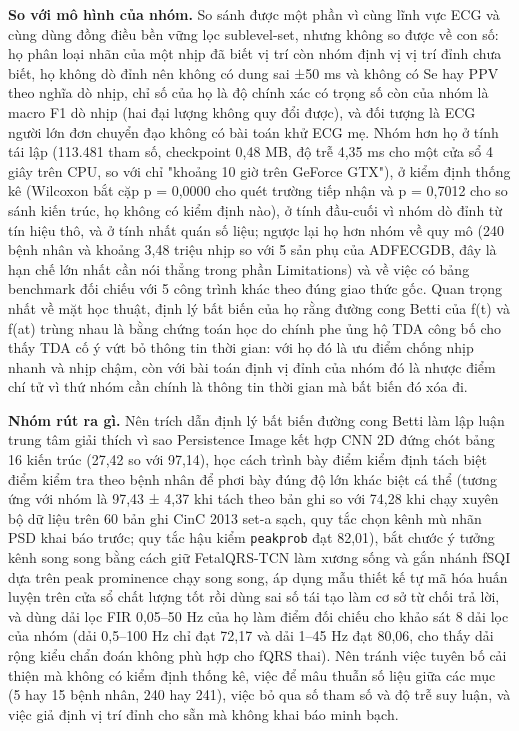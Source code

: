 \documentclass[12pt,a4paper]{article}
\begin{document}
\noindent \textbf{\color{tdtblue}So với mô hình của nhóm.} So sánh được một phần vì cùng lĩnh vực ECG và cùng dùng đồng điều bền vững lọc sublevel-set, nhưng không so được về con số: họ phân loại nhãn của một nhịp đã biết vị trí còn nhóm định vị vị trí đỉnh chưa biết, họ không dò đỉnh nên không có dung sai ±50 ms và không có Se hay PPV theo nghĩa dò nhịp, chỉ số của họ là độ chính xác có trọng số còn của nhóm là macro F1 dò nhịp (hai đại lượng không quy đổi được), và đối tượng là ECG người lớn đơn chuyển đạo không có bài toán khử ECG mẹ. Nhóm hơn họ ở tính tái lập (113.481 tham số, checkpoint 0,48 MB, độ trễ 4,35 ms cho một cửa sổ 4 giây trên CPU, so với chỉ "khoảng 10 giờ trên GeForce GTX"), ở kiểm định thống kê (Wilcoxon bắt cặp p = 0,0000 cho quét trường tiếp nhận và p = 0,7012 cho so sánh kiến trúc, họ không có kiểm định nào), ở tính đầu-cuối vì nhóm dò đỉnh từ tín hiệu thô, và ở tính nhất quán số liệu; ngược lại họ hơn nhóm về quy mô (240 bệnh nhân và khoảng 3,48 triệu nhịp so với 5 sản phụ của ADFECGDB, đây là hạn chế lớn nhất cần nói thẳng trong phần Limitations) và về việc có bảng benchmark đối chiếu với 5 công trình khác theo đúng giao thức gốc. Quan trọng nhất về mặt học thuật, định lý bất biến của họ rằng đường cong Betti của f(t) và f(at) trùng nhau là bằng chứng toán học do chính phe ủng hộ TDA công bố cho thấy TDA cố ý vứt bỏ thông tin thời gian: với họ đó là ưu điểm chống nhịp nhanh và nhịp chậm, còn với bài toán định vị đỉnh của nhóm đó là nhược điểm chí tử vì thứ nhóm cần chính là thông tin thời gian mà bất biến đó xóa đi.\par\vspace{3pt}
\noindent \textbf{\color{tdtblue}Nhóm rút ra gì.} Nên trích dẫn định lý bất biến đường cong Betti làm lập luận trung tâm giải thích vì sao Persistence Image kết hợp CNN 2D đứng chót bảng 16 kiến trúc (27,42 so với 97,14), học cách trình bày điểm kiểm định tách biệt điểm kiểm tra theo bệnh nhân để phơi bày đúng độ lớn khác biệt cá thể (tương ứng với nhóm là 97,43 ± 4,37 khi tách theo bản ghi so với 74,28 khi chạy xuyên bộ dữ liệu trên 60 bản ghi CinC 2013 set-a sạch, quy tắc chọn kênh mù nhãn PSD khai báo trước; quy tắc hậu kiểm \texttt{peakprob} đạt 82,01), bắt chước ý tưởng kênh song song bằng cách giữ FetalQRS-TCN làm xương sống và gắn nhánh fSQI dựa trên peak prominence chạy song song, áp dụng mẫu thiết kế tự mã hóa huấn luyện trên cửa sổ chất lượng tốt rồi dùng sai số tái tạo làm cơ sở từ chối trả lời, và dùng dải lọc FIR 0,05–50 Hz của họ làm điểm đối chiếu cho khảo sát 8 dải lọc của nhóm (dải 0,5–100 Hz chỉ đạt 72,17 và dải 1–45 Hz đạt 80,06, cho thấy dải rộng kiểu chẩn đoán không phù hợp cho fQRS thai). Nên tránh việc tuyên bố cải thiện mà không có kiểm định thống kê, việc để mâu thuẫn số liệu giữa các mục (5 hay 15 bệnh nhân, 240 hay 241), việc bỏ qua số tham số và độ trễ suy luận, và việc giả định vị trí đỉnh cho sẵn mà không khai báo minh bạch.\par\vspace{3pt}
\vspace{6pt}
\end{document}
